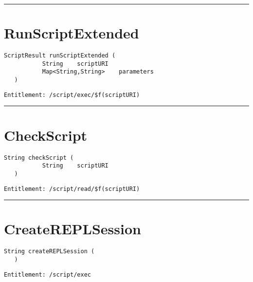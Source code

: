 \rule{12cm}{2pt}
\section{RunScriptExtended}
\label{Api:RunScriptExtended}
\begin{lstlisting}[style=nonumbers]
   ScriptResult runScriptExtended (
           String    scriptURI
           Map<String,String>    parameters
   )
\end{lstlisting}
\begin{Verbatim}[formatcom=\color{Maroon}]
  Entitlement: /script/exec/$f(scriptURI)
\end{Verbatim}



\rule{12cm}{2pt}
\section{CheckScript}
\label{Api:CheckScript}
\begin{lstlisting}[style=nonumbers]
   String checkScript (
           String    scriptURI
   )
\end{lstlisting}
\begin{Verbatim}[formatcom=\color{Maroon}]
  Entitlement: /script/read/$f(scriptURI)
\end{Verbatim}



\rule{12cm}{2pt}
\section{CreateREPLSession}
\label{Api:CreateREPLSession}
\begin{lstlisting}[style=nonumbers]
   String createREPLSession (
   )
\end{lstlisting}
\begin{Verbatim}[formatcom=\color{Maroon}]
  Entitlement: /script/exec
\end{Verbatim}



